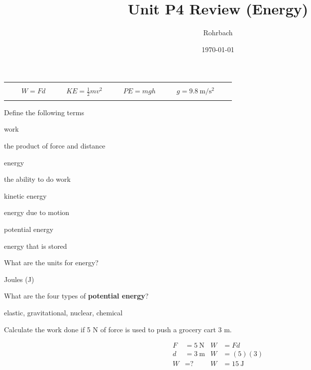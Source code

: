 \documentclass[10pt]{exam}
\title{Unit P4 Review (Energy)}
\author{Rohrbach}
\date{\today}
\newcommand{\printeqs}{
  \ifprintanswers
  \else
    \begin{center}
      \begin{tabular}{|*9c*5c|}
        \hline 
        &&&&&&&&&&&&&\\
        && 
        $W=Fd$                 & & & 
        $KE = \frac{1}{2}mv^2$ & & & 
        $PE=mgh$               & & & 
        $g=\SI{9.8}{\meter\per\second^2}$
        &&\\
        &&&&&&&&&&&&&\\
        \hline 
      \end{tabular}
    \end{center}
  \fi
}
\newenvironment{EnvKU}{
  \ifprintanswers
  \else
    \ku
  \fi
  \begin{solution}
}{
  \end{solution}
}
\begin{document}
\maketitle

\printeqs 
\begin{questions}
  
 
\question
  Define the following terms

  \begin{parts}
    \item work
      \begin{solution}[\stretch{1}]
        the product of force and distance
      \end{solution}

    \item energy
      \begin{solution}[\stretch{1}]
        the ability to do work
      \end{solution}

    \item kinetic energy
      \begin{solution}[\stretch{1}]
        energy due to motion
      \end{solution}

    \item potential energy
      \begin{solution}[\stretch{1}]
        energy that is stored
      \end{solution}

  \end{parts}

\question
  What are the units for energy?
  
  \begin{solution}[\stretch{1}]
    Joules (J)
  \end{solution}


\question
  What are the four types of {\bf potential energy}?

  \begin{solution}[\stretch{1}]
    elastic, gravitational, nuclear, chemical
  \end{solution}


\question
  Calculate the work done if 5 N of force is used to push a grocery cart 3 m. 

  \begin{EnvKU}
    \begin{align*}
      F &= \SI{5}{\newton} & W &= Fd \\
      d &= \SI{3}{\meter}  & W &=(5)(3) \\
      W &= \text{?}            & W &= \SI{15}{\joule}
    \end{align*}
  \end{EnvKU}


\end{questions}
\end{document}
